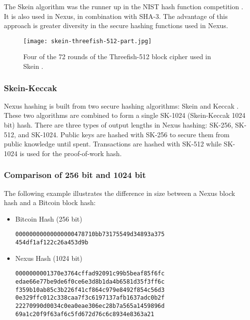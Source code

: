 \documentclass[11pt]{article}
\begin{document}
The Skein algorithm was the runner up in the NIST hash function competition \cite{wikiskein}.
It is also used in Nexus, in combination with SHA-3.
The advantage of this approach is greater diversity in the secure hashing functions used in Nexus.

\begin{wrapfigure}{r}{0.50\textwidth} %
    \caption{Four of the 72 rounds of the Threefish-512 block cipher used in Skein \cite{skeinpaper}.}
    \centering
    \texttt{[image: skein-threefish-512-part.jpg]}
\end{wrapfigure}

\pagebreak
\subsubsection{Skein-Keccak}

Nexus hashing is built from two secure hashing algorithms: Skein and Keccak \cite{sha3announce}. 
These two algorithms are combined to form a single SK-1024 (Skein-Keccak 1024 bit) hash. 
There are three types of output lengths in Nexus hashing: SK-256, SK-512, and SK-1024.
Public keys are hashed with SK-256 to secure them from public knowledge until spent. 
Transactions are hashed with SK-512 while SK-1024 is used for the proof-of-work hash.


\subsubsection{Comparison of 256 bit and 1024 bit}

The following example illustrates the difference in size between a Nexus block hash and a Bitcoin block hash:

\begin{itemize}
\item Bitcoin Hash (256 bit)
\begin{lstlisting}
00000000000000000478710bb73175549d34893a375
454df1af122c26a453d9b
\end{lstlisting}

\item Nexus Hash (1024 bit)

\begin{lstlisting}
0000000001370e3764cffad92091c99b5beaf85f6fc
edae66e77be9de6f0ce6e3d8b1da4b6581d35f3ff6c
f359b10ab85c3b226f41cf864c979e8492f854c56d3
0e329ffc012c338caa7f3c6197137afb1637adc0b2f
22270990d0034c0ea0eae306ec28b7a565a1459896d
69a1c20f9f63af6c5fd672d76c6c8934e8363a21
\end{lstlisting}
\end{itemize}
\end{document}
